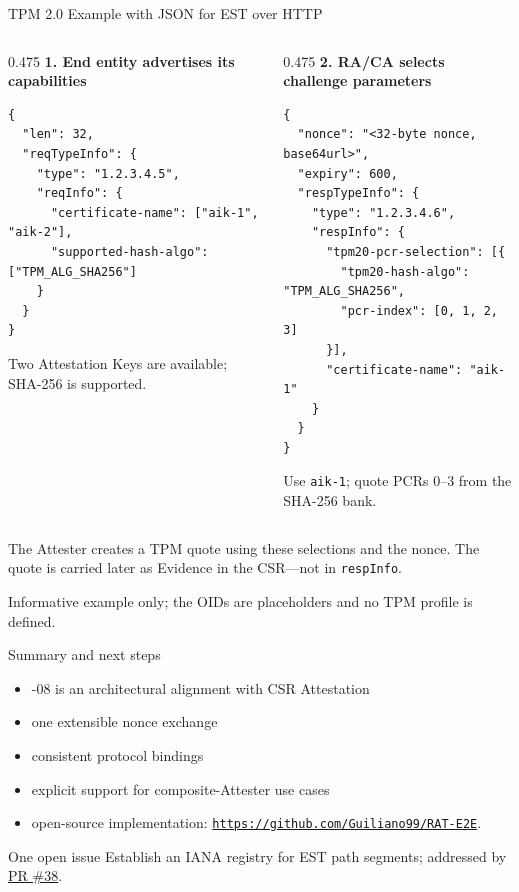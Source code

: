 \documentclass[aspectratio=169,10pt]{beamer}
\begin{document}
\begin{frame}[fragile]{TPM 2.0 Example with JSON for EST over HTTP}
  \begin{columns}[T,onlytextwidth]
    \begin{column}{0.475\textwidth}
      \textbf{\color{ietfblue}1. End entity advertises its capabilities}
\begin{lstlisting}[style=json]
{
  "len": 32,
  "reqTypeInfo": {
    "type": "1.2.3.4.5",
    "reqInfo": {
      "certificate-name": ["aik-1", "aik-2"],
      "supported-hash-algo": ["TPM_ALG_SHA256"]
    }
  }
}
\end{lstlisting}
      \footnotesize
      Two Attestation Keys are available; SHA-256 is supported.
    \end{column}
    \begin{column}{0.475\textwidth}
      \textbf{\color{ietfblue}2. RA/CA selects challenge parameters}
\begin{lstlisting}[style=json]
{
  "nonce": "<32-byte nonce, base64url>",
  "expiry": 600,
  "respTypeInfo": {
    "type": "1.2.3.4.6",
    "respInfo": {
      "tpm20-pcr-selection": [{
        "tpm20-hash-algo": "TPM_ALG_SHA256",
        "pcr-index": [0, 1, 2, 3]
      }],
      "certificate-name": "aik-1"
    }
  }
}
\end{lstlisting}
      \footnotesize
      Use \texttt{aik-1}; quote PCRs 0--3 from the SHA-256 bank.
    \end{column}
  \end{columns}
  \vspace{0cm}
    The Attester creates a TPM quote using these selections and the nonce.
    The quote is carried later as Evidence in the CSR---not in
    \texttt{respInfo}.\par
  \vspace{0.3cm}
  {\scriptsize\centering
  Informative example only; the OIDs are placeholders and no TPM profile is defined.\par}
\end{frame}

\begin{frame}{Summary and next steps}

  \begin{itemize}
    \item -08 is an architectural alignment with CSR Attestation
    \item one extensible nonce exchange
    \item consistent protocol bindings
    \item explicit support for composite-Attester use cases
    \item open-source implementation:
          \href{https://github.com/Guiliano99/RAT-E2E}{\texttt{https://github.com/Guiliano99/RAT-E2E}}.
  \end{itemize}

  \vspace{0.3cm}
  \begin{block}{One open issue}
    Establish an IANA registry for EST path segments; addressed by
    \href{https://github.com/lamps-wg/lamps-attestation-freshness/pull/38}{PR \#38}.
  \end{block}

\end{frame}
\end{document}

